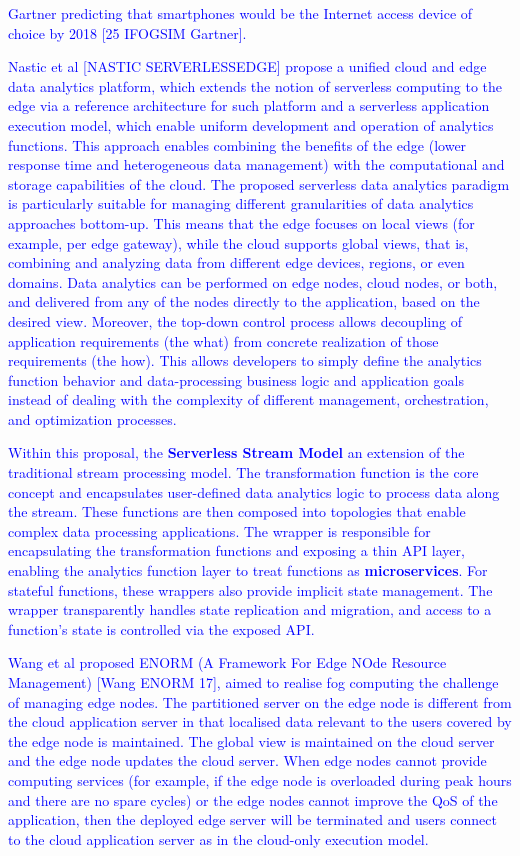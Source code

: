 \textcolor{blue}{ Gartner predicting that smartphones would be the Internet access device of choice by 2018 [25 IFOGSIM Gartner]. }  

\textcolor{blue}{ Nastic et al [NASTIC SERVERLESSEDGE] propose a unified cloud and edge data analytics platform, which extends the notion of serverless computing to the edge via a reference architecture for such platform and a serverless application execution model, which enable uniform development and operation of analytics functions. This approach enables combining the benefits of the edge (lower response time and heterogeneous data management) with the computational and storage capabilities of the cloud.
	The proposed serverless data analytics paradigm is particularly suitable for managing different granularities of data analytics approaches bottom-up. This means that the edge focuses on local views (for example, per edge gateway), while the cloud supports global views, that is, combining and analyzing data from different edge devices, regions, or even domains. Data analytics can be performed on edge nodes, cloud nodes, or both, and delivered from any of the nodes directly to the application, based on the desired view. Moreover, the top-down control process allows decoupling of application requirements (the what) from concrete realization of those requirements (the how). This allows developers to simply define the analytics function behavior and data-processing business logic and application goals  instead of dealing with the complexity of different management, orchestration,
	and optimization processes. }

\textcolor{blue}{ Within this proposal, the \textbf{Serverless Stream Model} an extension of the traditional stream processing model. The transformation function is the core concept and encapsulates user-defined data analytics logic to process data along the stream. These functions are then composed into topologies that enable complex data processing applications.  The wrapper is responsible for encapsulating the transformation functions and exposing a thin API layer, enabling the analytics function layer to treat functions as \textbf{microservices}.  For stateful functions, these wrappers also provide implicit state management. The wrapper transparently handles state replication and migration, and access to a function’s state is controlled via the exposed API. }

\textcolor{blue}{ Wang et al proposed ENORM (A Framework For Edge NOde Resource Management) [Wang ENORM 17], aimed to realise fog computing the challenge of managing edge nodes.  The partitioned server on the edge node is different from the cloud application server in that localised data relevant to the users covered by the edge node is maintained. The global view is maintained on the cloud server and the edge node updates the cloud server. When edge nodes cannot provide computing services (for example, if the edge node is overloaded during peak hours and there are no spare cycles) or the edge nodes cannot improve the QoS of the application, then the deployed edge server will be terminated and users connect to the cloud application server as in the cloud-only execution model.}

